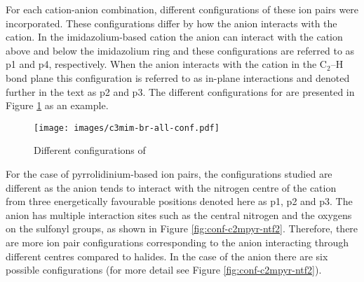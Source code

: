 For each cation-anion combination, different configurations of these ion pairs were incorporated. 
These configurations differ by how the anion interacts with the cation. 
In the imidazolium-based cation  the anion can interact with the cation above and below the imidazolium ring and these configurations are referred to as p1 and p4, respectively.
When the anion interacts with the cation in the $\text{C}_2\text{--H}$ bond plane this configuration is referred to as in-plane interactions and denoted further in the text as p2 and p3.
The different configurations for  are presented in Figure
\protect\ref{fig:conf-c3mim-br}
as an example. 



\begin{figure}
    \centering
    \texttt{[image: images/c3mim-br-all-conf.pdf]}
    \caption{Different configurations of \protect{} \label{fig:conf-c3mim-br}}
\end{figure}


For the case of pyrrolidinium-based ion pairs, the configurations studied are different as the anion tends to interact with the nitrogen centre of the cation from three energetically favourable positions denoted here as p1, p2 and p3.
\cite{Izgorodina2014a}
The \ntf anion has multiple interaction sites such as the central nitrogen and the oxygens on the sulfonyl groups, as shown in Figure \ref{fig:conf-c2mpyr-ntf2}.
Therefore, there are more ion pair configurations corresponding to the anion interacting through different centres compared to halides.
In the case of the \ntf anion there are six possible configurations (for more detail see Figure \ref{fig:conf-c2mpyr-ntf2}). 


